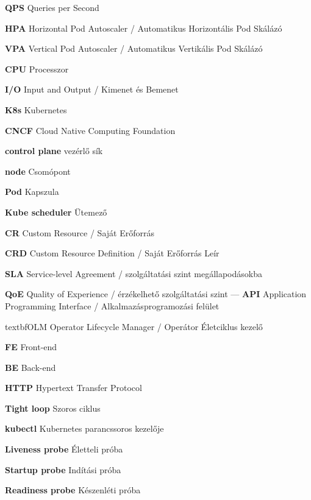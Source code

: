 \textbf{QPS} Queries per Second 

\textbf{HPA} Horizontal Pod Autoscaler / Automatikus Horizontális Pod Skálázó 

\textbf{VPA} Vertical Pod Autoscaler / Automatikus Vertikális Pod Skálázó 

\textbf{CPU} Processzor 

\textbf{I/O} Input and Output / Kimenet és Bemenet 

\textbf{K8s} Kubernetes 

\textbf{CNCF} Cloud Native Computing Foundation 

\textbf{control plane} vezérlő sík 

\textbf{node} Csomópont 

\textbf{Pod} Kapszula 

\textbf{Kube scheduler} Ütemező 

\textbf{CR} Custom Resource / Saját Erőforrás 

\textbf{CRD} Custom Resource Definition / Saját Erőforrás Leír

\textbf{SLA} Service-level Agreement / szolgáltatási szint megállapodásokba

\textbf{QoE} Quality of Experience / érzékelhető szolgáltatási szint
---
\textbf{API} Application Programming Interface / Alkalmazásprogramozási felület 

textbf{OLM} Operator Lifecycle Manager / Operátor Életciklus kezelő 

\textbf{FE} Front-end 

\textbf{BE} Back-end 

\textbf{HTTP} Hypertext Transfer Protocol 

\textbf{Tight loop} Szoros ciklus 

\textbf{kubectl} Kubernetes parancssoros kezelője 

\textbf{Liveness probe} Életteli próba 

\textbf{Startup probe} Indítási próba 

\textbf{Readiness probe} Készenléti próba 
